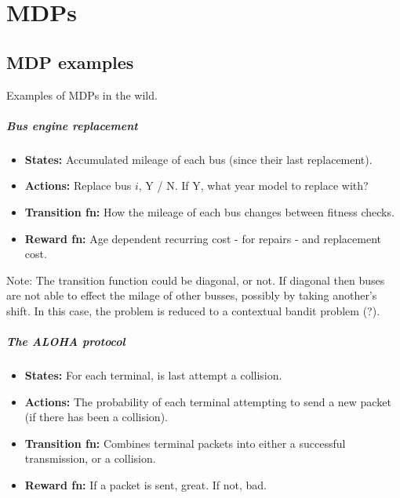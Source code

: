 \chapter{MDPs}

\section{MDP examples}\label{MDP-examples}
Examples of MDPs in the wild.

\hypertarget{bus-engine-replacement}{%
\paragraph{Bus engine replacement}\label{bus-engine-replacement}}

\begin{itemize}
\tightlist
\item
  \textbf{States:} Accumulated mileage of each bus (since their last
  replacement).
\item
  \textbf{Actions:} Replace bus \(i\), Y / N. If Y, what year model to
  replace with?
\item
  \textbf{Transition fn:} How the mileage of each bus changes between
  fitness checks.
\item
  \textbf{Reward fn:} Age dependent recurring cost - for repairs - and
  replacement cost.
\end{itemize}

Note: The transition function could be diagonal, or not. If diagonal
then buses are not able to effect the milage of other busses, possibly
by taking another's shift. In this case, the problem is reduced to a
contextual bandit problem (?).

\cite{Putterman2015}

\hypertarget{the-aloha-protocol}{%
\paragraph{The ALOHA protocol}\label{the-aloha-protocol}}

\begin{itemize}
\tightlist
\item
  \textbf{States:} For each terminal, is last attempt a collision.
\item
  \textbf{Actions:} The probability of each terminal attempting to send
  a new packet (if there has been a collision).
\item
  \textbf{Transition fn:} Combines terminal packets into either a
  successful transmission, or a collision.
\item
  \textbf{Reward fn:} If a packet is sent, great. If not, bad.
\end{itemize}

